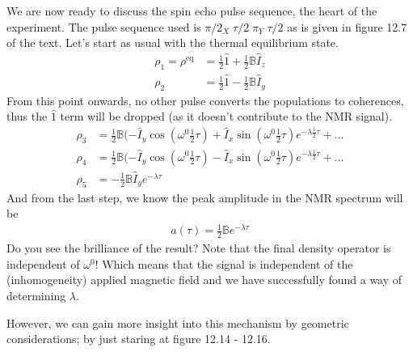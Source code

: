 			We are now ready to discuss the spin echo pulse sequence, the heart of the experiment. The pulse sequence used is $\pi/2_X \; \tau/2 \; \pi_Y \; \tau/2$ as is given in figure 12.7 of the text. Let's start as usual with the thermal equilibrium state.
			\begin{align}
				\rho_1 = \rho^\text{eq} &= \frac 1 2 \hat 1 + \frac 1 2 \mathbb B \hat I_z\\
				\rho_2 &= \frac 1 2 \hat 1 - \frac 1 2 \mathbb B \hat I_y
			\end{align}
			From this point onwards, no other pulse converts the populations to coherences, thus the $\hat 1$ term will be dropped (as it doesn't contribute to the NMR signal).
			\begin{align}
				\rho_3 &= \frac 1 2 \mathbb B (-\hat I_y \cos(\omega^0 \frac 1 2 \tau) + \hat I_x \sin(\omega^0 \frac 1 2 \tau) e^{-\lambda \frac 1 2 \tau} + ...	\\
				\rho_4 &= \frac 1 2 \mathbb B (-\hat I_y \cos(\omega^0 \frac 1 2 \tau) - \hat I_x \sin(\omega^0 \frac 1 2 \tau) e^{-\lambda \frac 1 2 \tau} + ... \\
				\rho_5 &= - \frac 1 2 \mathbb B \hat I_y e^{-\lambda \tau}
			\end{align}
			And from the last step, we know the peak amplitude in the NMR spectrum will be
			\begin{align}
				a(\tau)=\frac 1 2 \mathbb B e^{-\lambda \tau}
			\end{align}
			Do you see the brilliance of the result? Note that the final density operator is independent of $\omega^0$! Which means that the signal is independent of the (inhomogeneity) applied magnetic field and we have successfully found a way of determining $\lambda$.

			However, we can gain more insight into this mechanism by geometric considerations; by just staring at figure 12.14 - 12.16.
